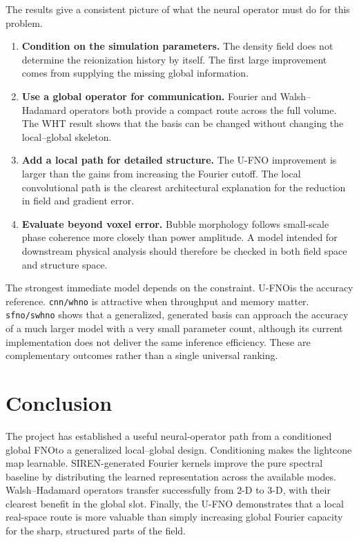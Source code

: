 \documentclass[11pt,a4paper]{article}
\newcommand{\FNO}{\textsc{FNO}}
\newcommand{\UFNO}{\textsc{U-FNO}}
\newcommand{\code}[1]{\texttt{#1}}
\begin{document}
The results give a consistent picture of what the neural operator must do for
this problem.
\begin{enumerate}
  \item \textbf{Condition on the simulation parameters.} The density field
  does not determine the reionization history by itself. The first large
  improvement comes from supplying the missing global information.
  \item \textbf{Use a global operator for communication.} Fourier and
  Walsh--Hadamard operators both provide a compact route across the full
  volume. The WHT result shows that the basis can be changed without changing
  the local--global skeleton.
  \item \textbf{Add a local path for detailed structure.} The \UFNO
  improvement is larger than the gains from increasing the Fourier cutoff.
  The local convolutional path is the clearest architectural explanation for
  the reduction in field and gradient error.
  \item \textbf{Evaluate beyond voxel error.} Bubble morphology follows
  small-scale phase coherence more closely than power amplitude. A model
  intended for downstream physical analysis should therefore be checked in
  both field space and structure space.
\end{enumerate}

The strongest immediate model depends on the constraint. \UFNO is the
accuracy reference. \code{cnn/whno} is attractive when throughput and memory
matter. \code{sfno/swhno} shows that a generalized, generated basis can
approach the accuracy of a much larger model with a very small parameter
count, although its current implementation does not deliver the same
inference efficiency. These are complementary outcomes rather than a single
universal ranking.

\section{Conclusion}

The project has established a useful neural-operator path from a conditioned
global \FNO to a generalized local--global design. Conditioning makes the
lightcone map learnable. SIREN-generated Fourier kernels improve the pure
spectral baseline by distributing the learned representation across the
available modes. Walsh--Hadamard operators transfer successfully from 2-D to
3-D, with their clearest benefit in the global slot. Finally, the \UFNO
demonstrates that a local real-space route is more valuable than simply
increasing global Fourier capacity for the sharp, structured parts of the
field.
\end{document}
